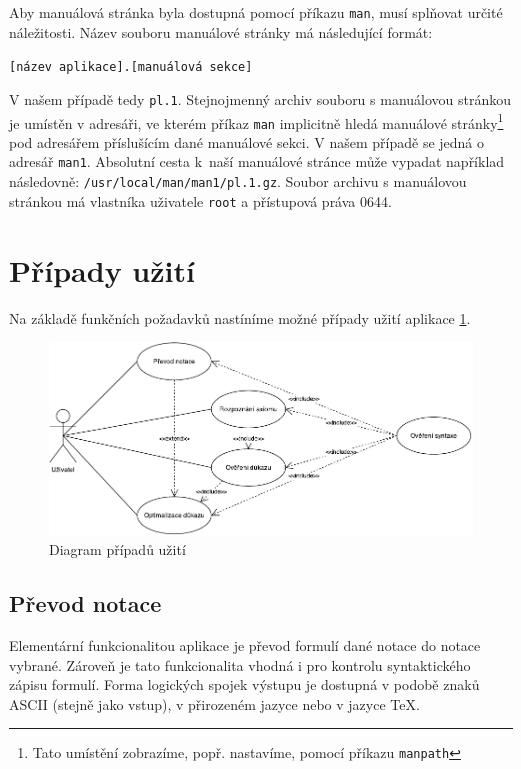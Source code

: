 \documentclass[thesis=B,czech,hidelinks]{thesis}[2012/06/26]
\begin{document}
Aby manuálová stránka byla dostupná pomocí příkazu \texttt{man}, musí splňovat určité náležitosti. Název souboru manuálové stránky má následující formát:

\begin{center}
\texttt{[název aplikace].[manuálová sekce]}
\end{center}

V našem případě tedy \texttt{pl.1}. Stejnojmenný archiv souboru s manuálovou stránkou je umístěn v adresáři, ve kterém příkaz \texttt{man} implicitně hledá manuálové stránky\footnote{Tato umístění zobrazíme, popř. nastavíme, pomocí příkazu \texttt{manpath}} pod adresářem příslušícím dané manuálové sekci. V našem případě se jedná o adresář \texttt{man1}. Absolutní cesta k~naší manuálové stránce může vypadat například následovně: \texttt{/usr/local/man/man1/pl.1.gz}. Soubor archivu s manuálovou stránkou má vlastníka uživatele \texttt{root} a přístupová práva 0644.

\section{Případy užití}
\label{sec:use_cases}

Na základě funkčních požadavků nastíníme možné případy užití aplikace \ref{fig:use_cases}.

\begin{figure}
\centering
\caption{Diagram případů užití}
\label{fig:use_cases}
\includegraphics{diagrams/use_cases}
\end{figure}

\subsection{Převod notace}

Elementární funkcionalitou aplikace je převod formulí dané notace do notace vybrané. Zároveň je tato funkcionalita vhodná i pro kontrolu syntaktického zápisu formulí. Forma logických spojek výstupu je dostupná v podobě znaků ASCII (stejně jako vstup), v přirozeném jazyce nebo v jazyce \TeX.
\end{document}
